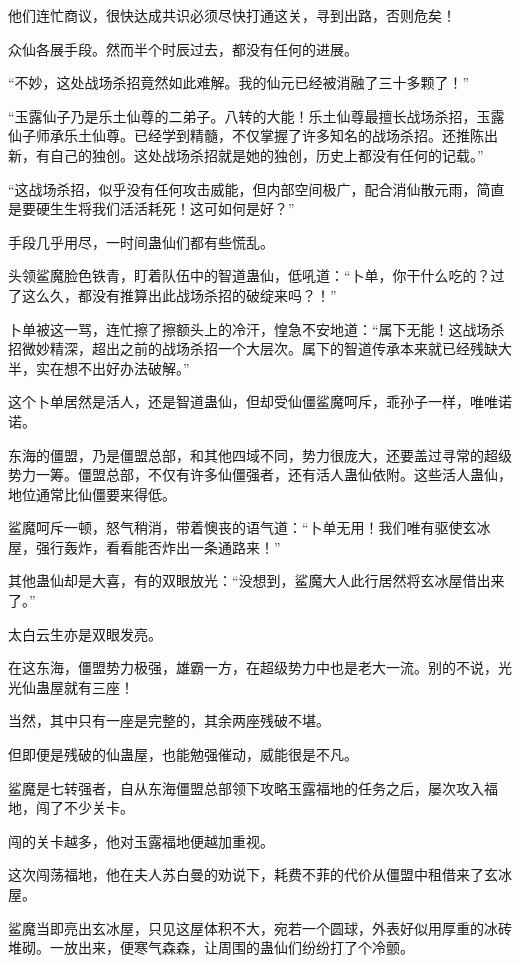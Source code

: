 \begin{this_body}
他们连忙商议，很快达成共识必须尽快打通这关，寻到出路，否则危矣！

众仙各展手段。然而半个时辰过去，都没有任何的进展。

“不妙，这处战场杀招竟然如此难解。我的仙元已经被消融了三十多颗了！”

“玉露仙子乃是乐土仙尊的二弟子。八转的大能！乐土仙尊最擅长战场杀招，玉露仙子师承乐土仙尊。已经学到精髓，不仅掌握了许多知名的战场杀招。还推陈出新，有自己的独创。这处战场杀招就是她的独创，历史上都没有任何的记载。”

“这战场杀招，似乎没有任何攻击威能，但内部空间极广，配合消仙散元雨，简直是要硬生生将我们活活耗死！这可如何是好？”

手段几乎用尽，一时间蛊仙们都有些慌乱。

头领鲨魔脸色铁青，盯着队伍中的智道蛊仙，低吼道：“卜单，你干什么吃的？过了这么久，都没有推算出此战场杀招的破绽来吗？！”

卜单被这一骂，连忙擦了擦额头上的冷汗，惶急不安地道：“属下无能！这战场杀招微妙精深，超出之前的战场杀招一个大层次。属下的智道传承本来就已经残缺大半，实在想不出好办法破解。”

这个卜单居然是活人，还是智道蛊仙，但却受仙僵鲨魔呵斥，乖孙子一样，唯唯诺诺。

东海的僵盟，乃是僵盟总部，和其他四域不同，势力很庞大，还要盖过寻常的超级势力一筹。僵盟总部，不仅有许多仙僵强者，还有活人蛊仙依附。这些活人蛊仙，地位通常比仙僵要来得低。

鲨魔呵斥一顿，怒气稍消，带着懊丧的语气道：“卜单无用！我们唯有驱使玄冰屋，强行轰炸，看看能否炸出一条通路来！”

其他蛊仙却是大喜，有的双眼放光：“没想到，鲨魔大人此行居然将玄冰屋借出来了。”

太白云生亦是双眼发亮。

在这东海，僵盟势力极强，雄霸一方，在超级势力中也是老大一流。别的不说，光光仙蛊屋就有三座！

当然，其中只有一座是完整的，其余两座残破不堪。

但即便是残破的仙蛊屋，也能勉强催动，威能很是不凡。

鲨魔是七转强者，自从东海僵盟总部领下攻略玉露福地的任务之后，屡次攻入福地，闯了不少关卡。

闯的关卡越多，他对玉露福地便越加重视。

这次闯荡福地，他在夫人苏白曼的劝说下，耗费不菲的代价从僵盟中租借来了玄冰屋。

鲨魔当即亮出玄冰屋，只见这屋体积不大，宛若一个圆球，外表好似用厚重的冰砖堆砌。一放出来，便寒气森森，让周围的蛊仙们纷纷打了个冷颤。


\end{this_body}
